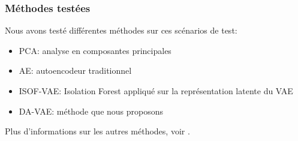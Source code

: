 \documentclass{beamer}
\begin{document}
		\begin{frame}
		\frametitle{Méthodes testées}
		Nous avons testé différentes méthodes sur ces scénarios de test:
		\begin{itemize}
			\item PCA: analyse en composantes principales
			\item AE: autoencodeur traditionnel
			\item ISOF-VAE: Isolation Forest appliqué sur la représentation latente du VAE
			\item DA-VAE: méthode que nous proposons
		\end{itemize}
	
		Plus d'informations sur les autres méthodes, voir \hyperlink{supplemental}{}.
		
	\end{frame}
\end{document}
